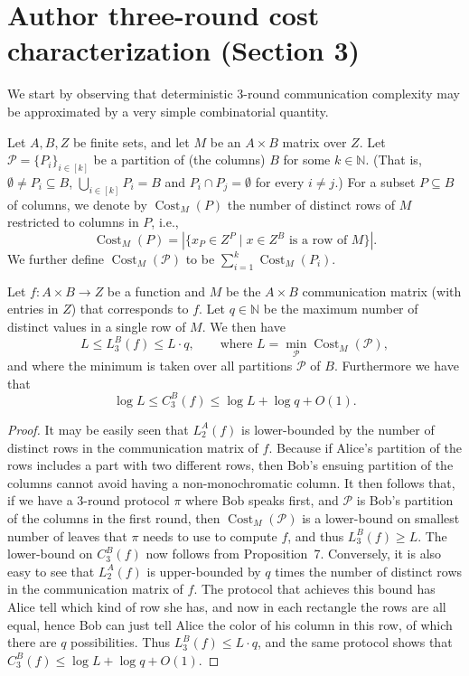 \section*{Author three-round cost characterization (Section 3)}
We start by observing that deterministic 3-round communication complexity may be approximated by a very simple combinatorial quantity.
\begin{definition}
Let $A,B,Z$ be finite sets, and let $M$ be an $A\times B$ matrix over $Z$. Let $\mathcal P=\{P_i\}_{i\in[k]}$ be a partition of (the columns) $B$ for some $k\in\mathbb N$. (That is, $\emptyset\ne P_i\subseteq B$, $\bigcup_{i\in[k]}P_i=B$ and $P_i\cap P_j=\emptyset$ for every $i\ne j$.) For a subset $P\subseteq B$ of columns, we denote by $\operatorname{Cost}_M(P)$ the number of distinct rows of $M$ restricted to columns in $P$, i.e.,
\[\operatorname{Cost}_M(P)=|\{x_P\in Z^P\mid x\in Z^B\text{ is a row of }M\}|.\]
We further define $\operatorname{Cost}_M(\mathcal P)$ to be $\sum_{i=1}^k\operatorname{Cost}_M(P_i)$.
\end{definition}
\begin{proposition}\label{prop:cost}
Let $f:A\times B\to Z$ be a function and $M$ be the $A\times B$ communication matrix (with entries in $Z$) that corresponds to $f$. Let $q\in\mathbb N$ be the maximum number of distinct values in a single row of $M$. We then have
\[ L\le L_3^B(f)\le L\cdot q,\qquad\text{where }L=\min_{\mathcal P}\operatorname{Cost}_M(\mathcal P),\]
and where the minimum is taken over all partitions $\mathcal P$ of $B$. Furthermore we have that
\[\log L\le C_3^B(f)\le\log L+\log q+O(1).\]
\end{proposition}
\begin{proof}
It may be easily seen that $L_2^A(f)$ is lower-bounded by the number of distinct rows in the communication matrix of $f$. Because if Alice's partition of the rows includes a part with two different rows, then Bob's ensuing partition of the columns cannot avoid having a non-monochromatic column. It then follows that, if we have a 3-round protocol $\pi$ where Bob speaks first, and $\mathcal P$ is Bob's partition of the columns in the first round, then $\operatorname{Cost}_M(\mathcal P)$ is a lower-bound on smallest number of leaves that $\pi$ needs to use to compute $f$, and thus $L_3^B(f)\ge L$. The lower-bound on $C_3^B(f)$ now follows from Proposition~7.
Conversely, it is also easy to see that $L_2^A(f)$ is upper-bounded by $q$ times the number of distinct rows in the communication matrix of $f$. The protocol that achieves this bound has Alice tell which kind of row she has, and now in each rectangle the rows are all equal, hence Bob can just tell Alice the color of his column in this row, of which there are $q$ possibilities. Thus $L_3^B(f)\le L\cdot q$, and the same protocol shows that $C_3^B(f)\le\log L+\log q+O(1)$.
\end{proof}
